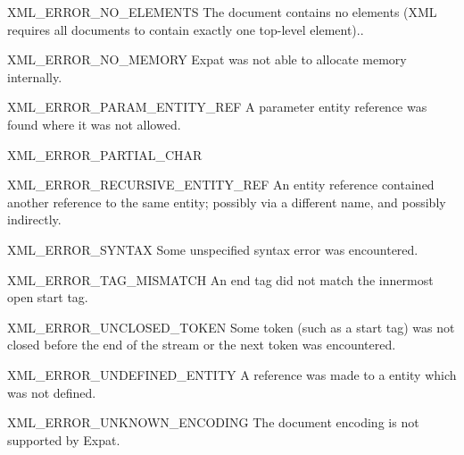 \begin{datadescni}{XML_ERROR_NO_ELEMENTS}
The document contains no elements (XML requires all documents to
contain exactly one top-level element)..
\end{datadescni}

\begin{datadescni}{XML_ERROR_NO_MEMORY}
Expat was not able to allocate memory internally.
\end{datadescni}

\begin{datadescni}{XML_ERROR_PARAM_ENTITY_REF}
A parameter entity reference was found where it was not allowed.
\end{datadescni}

\begin{datadescni}{XML_ERROR_PARTIAL_CHAR}

\end{datadescni}

\begin{datadescni}{XML_ERROR_RECURSIVE_ENTITY_REF}
An entity reference contained another reference to the same entity;
possibly via a different name, and possibly indirectly.
\end{datadescni}

\begin{datadescni}{XML_ERROR_SYNTAX}
Some unspecified syntax error was encountered.
\end{datadescni}

\begin{datadescni}{XML_ERROR_TAG_MISMATCH}
An end tag did not match the innermost open start tag.
\end{datadescni}

\begin{datadescni}{XML_ERROR_UNCLOSED_TOKEN}
Some token (such as a start tag) was not closed before the end of the
stream or the next token was encountered.
\end{datadescni}

\begin{datadescni}{XML_ERROR_UNDEFINED_ENTITY}
A reference was made to a entity which was not defined.
\end{datadescni}

\begin{datadescni}{XML_ERROR_UNKNOWN_ENCODING}
The document encoding is not supported by Expat.
\end{datadescni}
